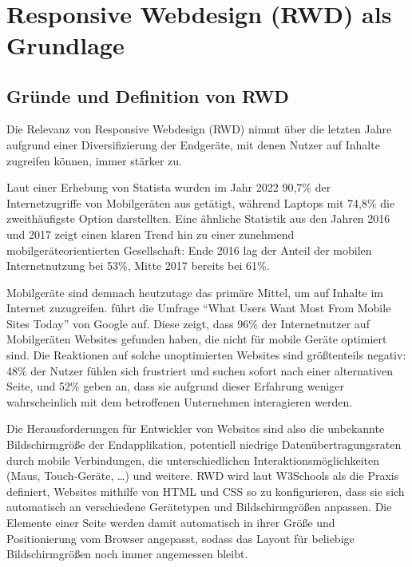 \newpage
\
\newpage

\section{Responsive Webdesign (RWD) als Grundlage}

\subsection{Gründe und Definition von RWD}

Die Relevanz von Responsive Webdesign (RWD) nimmt über die letzten Jahre aufgrund einer Diversifizierung der Endgeräte, mit denen Nutzer auf Inhalte zugreifen können, immer stärker zu.

Laut einer Erhebung von Statista \autocite{statista.DataReportal.WeAreSocial.Hootsuite.2023} wurden im Jahr 2022 90,7\% der Internetzugriffe von Mobilgeräten aus getätigt, während Laptops mit 74,8\% die zweithäufigste Option darstellten.
Eine ähnliche Statistik aus den Jahren 2016 und 2017 \autocite{statista.GWI.2017} zeigt einen klaren Trend hin zu einer zunehmend mobilgeräteorientierten Gesellschaft: Ende 2016 lag der Anteil der mobilen Internetnutzung bei 53\%, Mitte 2017 bereits bei 61\%.

Mobilgeräte sind demnach heutzutage das primäre Mittel, um auf Inhalte im Internet zuzugreifen.
\autocite[S. 25]{Harmsen.2018} führt die Umfrage "`What Users Want Most From Mobile Sites Today"' von Google \autocite{Google.WhatUsersWantFromMobile.2012} auf.
Diese zeigt, dass 96\% der Internetnutzer auf Mobilgeräten Websites gefunden haben, die nicht für mobile Geräte optimiert sind.
Die Reaktionen auf solche unoptimierten Websites sind größtenteils negativ: 48\% der Nutzer fühlen sich frustriert und suchen sofort nach einer alternativen Seite, und 52\% geben an, dass sie aufgrund dieser Erfahrung weniger wahrscheinlich mit dem betroffenen Unternehmen interagieren werden.

\autocite[S. 25-33]{Harmsen.2018} Die Herausforderungen für Entwickler von Websites sind also die unbekannte Bildschirmgröße der Endapplikation, potentiell niedrige Datenübertragungsraten durch mobile Verbindungen, die unterschiedlichen Interaktionsmöglichkeiten (Maus, Touch-Geräte, \ldots) und weitere.
RWD wird laut W3Schools \autocite{W3Schools.ResponsiveWebDesign.2024} als die Praxis definiert, Websites mithilfe von HTML und CSS so zu konfigurieren, dass sie sich automatisch an verschiedene Gerätetypen und Bildschirmgrößen anpassen.
Die Elemente einer Seite werden damit automatisch in ihrer Größe und Positionierung vom Browser angepasst, sodass das Layout für beliebige Bildschirmgrößen noch immer angemessen bleibt.

